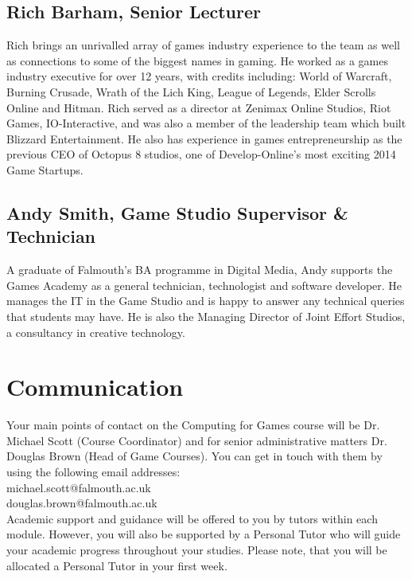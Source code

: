 \subsection{Rich Barham, Senior Lecturer}

Rich brings an unrivalled array of games industry experience to the team as well as connections to some of the biggest names in gaming.  He worked as a games industry executive for over 12 years, with credits including: World of Warcraft, Burning Crusade, Wrath of the Lich King, League of Legends, Elder Scrolls Online and Hitman. Rich served as a director at Zenimax Online Studios, Riot Games, IO-Interactive, and was also a member of the leadership team which built Blizzard Entertainment. He also has experience in games entrepreneurship as the previous CEO of Octopus 8 studios, one of Develop-Online's most exciting 2014 Game Startups.\\

\subsection{Andy Smith, Game Studio Supervisor \& Technician}

A graduate of Falmouth's BA programme in Digital Media, Andy supports the Games Academy as a general technician, technologist and software developer. He manages the IT in the Game Studio and is happy to answer any technical queries that students may have. He is also the Managing Director of Joint Effort Studios, a consultancy in creative technology.\\

\section{Communication}

Your main points of contact on the Computing for Games course will be Dr. Michael Scott (Course Coordinator) and for senior administrative matters Dr. Douglas Brown (Head of Game Courses). You can get in touch with them by using the following email addresses:\\

michael.scott@falmouth.ac.uk \\
douglas.brown@falmouth.ac.uk\\

Academic support and guidance will be offered to you by tutors within each module. However, you will also be supported by a Personal Tutor who will guide your academic progress throughout your studies. Please note, that you will be allocated a Personal Tutor in your first week.\\

